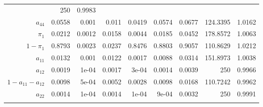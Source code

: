 \documentclass[]{article}
\begin{document}
\begin{longtable}[]{@{}rrrrrrrrr@{}}
& 250 & 0.9983\tabularnewline
\(a_{44}\) & 0.0558 & 0.001 & 0.011 & 0.0419 & 0.0574 & 0.0677 &
124.3395 & 1.0162\tabularnewline
\(\pi_{1}\) & 0.0212 & 0.0012 & 0.0158 & 0.0044 & 0.0185 & 0.0452 &
178.8572 & 1.0063\tabularnewline
\(1 - \pi_{1}\) & 0.8793 & 0.0023 & 0.0237 & 0.8476 & 0.8803 & 0.9057 &
110.8629 & 1.0212\tabularnewline
\(a_{11}\) & 0.0132 & 0.001 & 0.0122 & 0.0017 & 0.0088 & 0.0314 &
151.8973 & 1.0038\tabularnewline
\(a_{12}\) & 0.0019 & 1e-04 & 0.0017 & 3e-04 & 0.0014 & 0.0039 & 250 &
0.9966\tabularnewline
\(1 - a_{11} - a_{12}\) & 0.0098 & 5e-04 & 0.0052 & 0.0028 & 0.0098 &
0.0168 & 110.7242 & 0.9962\tabularnewline
\(a_{22}\) & 0.0014 & 1e-04 & 0.0014 & 1e-04 & 9e-04 & 0.0032 & 250 &
0.9991\tabularnewline
\normalsize & & & & & & & &\tabularnewline
\bottomrule
\end{longtable}

\renewcommand\refname{Original Computing Environment}

\end{document}
